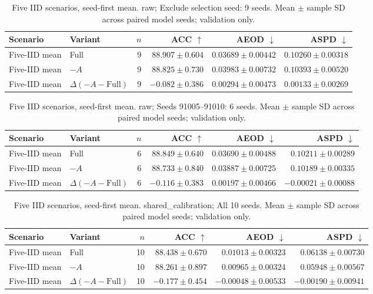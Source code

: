 \begin{table}[t]
\centering
\small
\caption{Five IID scenarios, seed-first mean. raw; Exclude selection seed: 9 seeds. Mean $\pm$ sample SD across paired model seeds; validation only.}
\begin{tabular}{llrrrr}
\toprule
Scenario & Variant & $n$ & ACC $\uparrow$ & AEOD $\downarrow$ & ASPD $\downarrow$ \\
\midrule
Five-IID mean & Full & 9 & $88.907 \pm 0.604$ & $0.03689 \pm 0.00442$ & $0.10260 \pm 0.00318$ \\
Five-IID mean & $-A$ & 9 & $88.825 \pm 0.730$ & $0.03983 \pm 0.00732$ & $0.10393 \pm 0.00520$ \\
Five-IID mean & $\Delta(-A-\mathrm{Full})$ & 9 & $-0.082 \pm 0.386$ & $0.00294 \pm 0.00473$ & $0.00133 \pm 0.00269$ \\
\bottomrule
\end{tabular}
\end{table}

\begin{table}[t]
\centering
\small
\caption{Five IID scenarios, seed-first mean. raw; Seeds 91005–91010: 6 seeds. Mean $\pm$ sample SD across paired model seeds; validation only.}
\begin{tabular}{llrrrr}
\toprule
Scenario & Variant & $n$ & ACC $\uparrow$ & AEOD $\downarrow$ & ASPD $\downarrow$ \\
\midrule
Five-IID mean & Full & 6 & $88.849 \pm 0.640$ & $0.03690 \pm 0.00488$ & $0.10211 \pm 0.00289$ \\
Five-IID mean & $-A$ & 6 & $88.733 \pm 0.840$ & $0.03887 \pm 0.00725$ & $0.10189 \pm 0.00335$ \\
Five-IID mean & $\Delta(-A-\mathrm{Full})$ & 6 & $-0.116 \pm 0.383$ & $0.00197 \pm 0.00466$ & $-0.00021 \pm 0.00088$ \\
\bottomrule
\end{tabular}
\end{table}

\begin{table}[t]
\centering
\small
\caption{Five IID scenarios, seed-first mean. shared\_calibration; All 10 seeds. Mean $\pm$ sample SD across paired model seeds; validation only.}
\begin{tabular}{llrrrr}
\toprule
Scenario & Variant & $n$ & ACC $\uparrow$ & AEOD $\downarrow$ & ASPD $\downarrow$ \\
\midrule
Five-IID mean & Full & 10 & $88.438 \pm 0.670$ & $0.01013 \pm 0.00323$ & $0.06138 \pm 0.00730$ \\
Five-IID mean & $-A$ & 10 & $88.261 \pm 0.897$ & $0.00965 \pm 0.00324$ & $0.05948 \pm 0.00567$ \\
Five-IID mean & $\Delta(-A-\mathrm{Full})$ & 10 & $-0.177 \pm 0.454$ & $-0.00048 \pm 0.00533$ & $-0.00190 \pm 0.00941$ \\
\bottomrule
\end{tabular}
\end{table}

